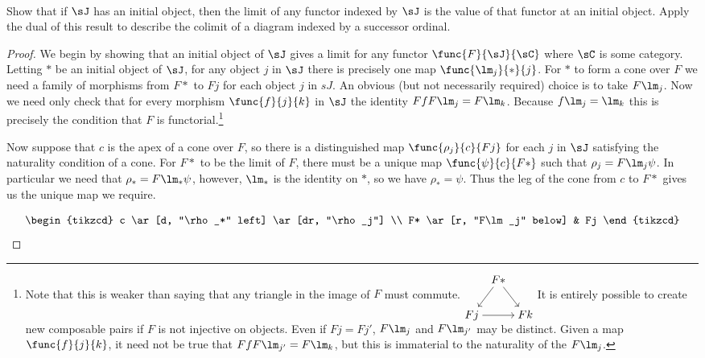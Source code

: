 \documentclass[main.tex]{subfiles}
\begin{document}
\paragraph{}
\begin{exercise}
	Show that if \(\sJ\) has an initial object, then the limit of any functor
	indexed by \(\sJ\) is the value of that functor at an initial object. Apply
	the dual of this result to describe the colimit of a diagram indexed by a
	successor ordinal.
\end{exercise}

\begin{proof}
	We begin by showing that an initial object of \(\sJ\) gives a limit for any
	functor \(\func{F}{\sJ}{\sC}\) where \(\sC\) is some category. Letting \(*\)
	be an initial object of \(\sJ\), for any object \(j\) in \(\sJ\) there is
	precisely one map \(\func{\lm_j}{*}{j}\). For \(*\) to form a cone over
	\(F\) we need a family of morphisms from \(F*\) to \(Fj\) for each object
	\(j\) in \(sJ\). An obvious (but not necessarily required) choice is to take
	\(F\lm_j\). Now we need only check that for every morphism
	\(\func{f}{j}{k}\) in \(\sJ\) the identity \(FfF\lm_j=F\lm_k\). Because
	\(f\lm_j=\lm_k\) this is precisely the condition that \(F\) is
	functorial.\footnote{Note that this is weaker than saying that any triangle
		in the image of \(F\) must commute.
		\(\begin{tikzcd}[ampersand replacement=\&, cramped, column sep=.5em]
			\&F* \ar[dr] \ar[dl] \\ Fj \ar[rr] \&\& Fk
		\end{tikzcd}\) It is entirely possible to create new composable pairs if
		\(F\) is not injective on objects. Even if \(Fj=Fj'\), \(F\lm_j\) and
		\(F\lm_{j'}\) may be distinct. Given a map \(\func{f}{j}{k}\), it need
		not be true that \(FfF\lm_{j'}=F\lm_k\), but this is immaterial to the
		naturality of the \(F\lm_j\).}

	Now suppose that \(c\) is the apex of a cone over \(F\), so there is a
	distinguished map \(\func{\rho_j}{c}{Fj}\) for each \(j\) in \(\sJ\)
	satisfying the naturality condition of a cone. For \(F*\) to be the limit of
	\(F\), there must be a unique map \(\func{\psi}{c}{F*}\) such that
	\(\rho_j=F\lm_j\psi\). In particular we need that \(\rho_*=F\lm_*\psi\),
	however, \(\lm_*\) is the identity on \(*\), so we have \(\rho_*=\psi\).
	Thus the leg of the cone from \(c\) to \(F*\) gives us the unique map we
	require.

	\[\begin{tikzcd}
			c \ar[d, "\rho_*" left] \ar[dr, "\rho_j"] \\
			F* \ar[r, "F\lm_j" below] & Fj
	\end{tikzcd}\]


\end{proof}
\end{document}
